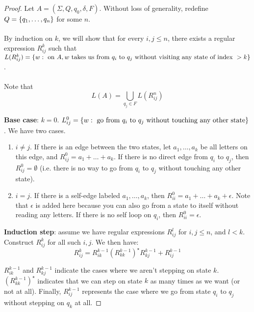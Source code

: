 \documentclass[]{article}
\DeclarePairedDelimiter{\set}{\lbrace}{\rbrace}
\theoremstyle{definition}
\begin{document}
        \begin{proof}
          Let $A = (\Sigma, Q, q_0, \delta, F)$. Without loss of generality, redefine $Q = \set{ q_1, \ldots, q_n }$ for some $n$.
          \\ \\
          By induction on $k$, we will show that for every $i, j \le n$, there exists a regular expression $R_{ij}^k$ such that $L(R_{ij}^k) = \set{ w : \text{ on } A, w \text{ takes us from } q_i \text{ to } q_j \text{ without visiting any state of index } > k}$.
          \\ \\
          Note that
          $$
            L(A) = \bigcup_{q_j \in F} L(R_{ij}^n)
          $$

          \textbf{Base case}: $k = 0$. $L_{ij}^0 = \set{ w : \text{ go from } q_i \text{ to } q_j \text{ without touching any other state}}$. We have two cases.

          \begin{enumerate}
            \item $i \ne j$. If there is an edge between the two states, let $a_1, \ldots, a_k$ be all letters on this edge, and $R_{ij}^0 = a_1 + \ldots + a_k$. If there is no direct edge from $q_i$ to $q_j$, then $R_{ij}^0 = \emptyset$ (i.e. there is no way to go from $q_i$ to $q_j$ without touching any other state).
            \item $i = j$. If there is a self-edge labeled $a_1, \ldots, a_k$, then $R_{ii}^0 = a_1 + \ldots + a_k + \epsilon$. Note that $\epsilon$ is added here because you can also go from a state to itself without reading any letters. If there is no self loop on $q_i$, then $R_{ii}^0 = \epsilon$.
          \end{enumerate}

          \textbf{Induction step}: assume we have regular expressions $R_{ij}^l$ for $i, j \le n$, and $l < k$. Construct $R_{ij}^k$ for all such $i, j$. We then have:
          $$
            R_{ij}^k = R_{ik}^{k - 1} (R_{kk}^{k - 1})^\star R_{kj}^{k - 1} + R_{ij}^{k - 1}
          $$

          $R_{ik}^{k - 1}$ and $R_{kj}^{k - 1}$ indicate the cases where we aren't stepping on state $k$. $(R_{kk}^{k - 1})^\star$ indicates that we can step on state $k$ as many times as we want (or not at all). Finally, $R_{ij}^{k - 1}$ represents the case where we go from state $q_i$ to $q_j$ without stepping on $q_k$ at all.
        \end{proof}
\end{document}
